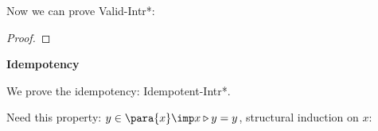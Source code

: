 Now we can prove {\sc Valid-Intr*}: 

\begin{proof}
\end{proof}

\bigskip
{\bf Idempotency}

We prove the idempotency: {\sc Idempotent-Intr*}.

Need this property:  $y \in \para{x} \imp x \triangleright y = y$, structural induction on $x$:

